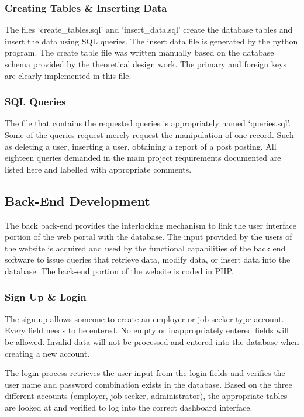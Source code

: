 \documentclass[11pt]{article}
\begin{document}
\subsubsection{Creating Tables \& Inserting Data}
The files `create\_tables.sql' and `insert\_data.sql' create the database tables and insert the data using SQL queries. The insert data file is generated by the python program. The create table file was written manually based on the database schema provided by the theoretical design work. The primary and foreign keys are clearly implemented in this file.


\subsubsection{SQL Queries}

The file that contains the requested queries is appropriately named `queries.sql'. Some of the queries request merely request the manipulation of one record. Such as deleting a user, inserting a user, obtaining a report of a post posting. All eighteen queries demanded in the main project requirements documented are listed here and labelled with appropriate comments. 


\subsection{Back-End Development}

The back back-end provides the interlocking mechanism to link the user interface portion of the web portal with the database. The input provided by the users of the website is acquired and used by the functional capabilities of the back end software to issue queries that retrieve data, modify data, or insert data into the database. The back-end portion of the website is coded in PHP.

\subsubsection{Sign Up \& Login}

The sign up allows someone to create an employer or job seeker type account. Every field needs to be entered. No empty or inappropriately entered fields will be allowed. Invalid data will not be processed and entered into the database when creating a new account. \par
The login process retrieves the user input from the login fields and verifies the user name and password combination exists in the database. Based on the three different accounts (employer, job seeker, administrator), the appropriate tables are looked at and verified to log into the correct dashboard interface.
\end{document}
